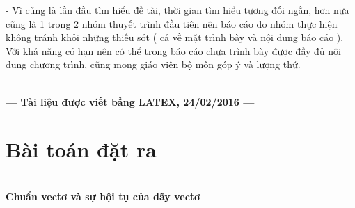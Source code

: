 \documentclass[12pt,a4paper]{article}
\begin{document}
- Vì cũng là lần đầu tìm hiểu đề tài, thời gian tìm hiểu tương đối ngắn, hơn nữa cũng là 1 trong 2 nhóm thuyết trình đầu tiên nên báo cáo do nhóm thực hiện không tránh khỏi những thiếu sót ( cả về mặt trình bày và nội dung báo cáo ). Với khả năng có hạn nên có thể trong báo cáo chưa trình bày được đầy đủ nội dung chương trình, cũng mong giáo viên bộ môn góp ý và lượng thứ.\\

\begin{center}
\\ \textbf{--- Tài liệu được viết bằng LATEX, 24/02/2016 ---}\\
\end{center} 



\newpage



\section{Bài toán đặt ra}\\
\hspace{0.7cm}\textbf{Chuẩn vectơ và sự hội tụ của dãy vectơ}\\ 
\end{document}
